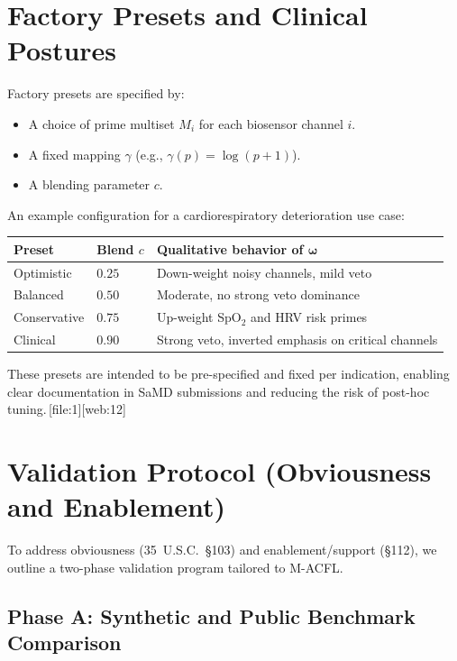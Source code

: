 \documentclass[11pt]{article}
\begin{document}
\section{Factory Presets and Clinical Postures}

Factory presets are specified by:
\begin{itemize}
  \item A choice of prime multiset $M_i$ for each biosensor channel $i$.
  \item A fixed mapping $\gamma$ (e.g., $\gamma(p) = \log(p+1)$).
  \item A blending parameter $c$.
\end{itemize}

An example configuration for a cardiorespiratory deterioration use case:

\begin{center}
\begin{tabular}{l l l}
\hline
\textbf{Preset} & \textbf{Blend $c$} & \textbf{Qualitative behavior of $\boldsymbol{\omega}$} \\
\hline
Optimistic  & $0.25$ & Down-weight noisy channels, mild veto \\
Balanced    & $0.50$ & Moderate, no strong veto dominance \\
Conservative& $0.75$ & Up-weight SpO$_2$ and HRV risk primes \\
Clinical    & $0.90$ & Strong veto, inverted emphasis on critical channels \\
\hline
\end{tabular}
\end{center}

These presets are intended to be pre-specified and fixed per indication, enabling clear documentation in SaMD submissions and reducing the risk of post-hoc tuning.\,[file:1][web:12] 

\section{Validation Protocol (Obviousness and Enablement)}

To address obviousness (35~U.S.C.~\S103) and enablement/support (\S112), we outline a two-phase validation program tailored to M-ACFL.

\subsection{Phase A: Synthetic and Public Benchmark Comparison}
\end{document}
